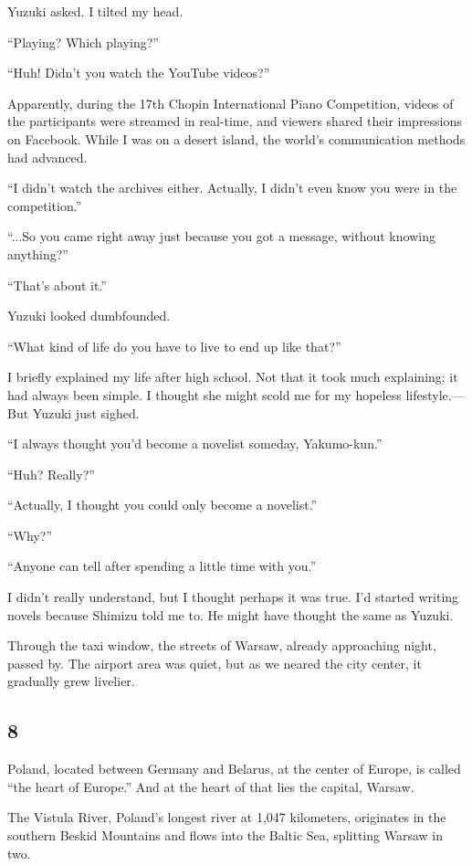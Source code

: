 \documentclass[
    a4paper,
    12pt,
    twoside,
    openany,
    UTF8,
    fontset=windows
]{ctexbook}
\begin{document}
Yuzuki asked. I tilted my head.

``Playing? Which playing?''

``Huh! Didn't you watch the YouTube videos?''

Apparently, during the 17th Chopin International Piano Competition, videos of the participants were streamed in real-time, and viewers shared their impressions on Facebook. While I was on a desert island, the world's communication methods had advanced.

``I didn't watch the archives either. Actually, I didn't even know you were in the competition.''

``...So you came right away just because you got a message, without knowing anything?''

``That's about it.''

Yuzuki looked dumbfounded.

``What kind of life do you have to live to end up like that?''

I briefly explained my life after high school. Not that it took much explaining; it had always been simple. I thought she might scold me for my hopeless lifestyle.---But Yuzuki just sighed.

``I always thought you'd become a novelist someday, Yakumo-kun.''

``Huh? Really?''

``Actually, I thought you could only become a novelist.''

``Why?''

``Anyone can tell after spending a little time with you.''

I didn't really understand, but I thought perhaps it was true. I'd started writing novels because Shimizu told me to. He might have thought the same as Yuzuki.

Through the taxi window, the streets of Warsaw, already approaching night, passed by. The airport area was quiet, but as we neared the city center, it gradually grew livelier.


\subsection*{8}

Poland, located between Germany and Belarus, at the center of Europe, is called ``the heart of Europe.'' And at the heart of that lies the capital, Warsaw.

The Vistula River, Poland's longest river at 1,047 kilometers, originates in the southern Beskid Mountains and flows into the Baltic Sea, splitting Warsaw in two.
\end{document}
